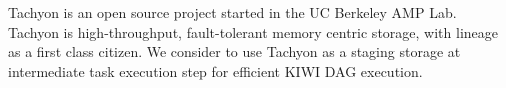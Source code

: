 \documentclass[twocolumn]{article}
\begin{document}
Tachyon is an open source project started in the UC Berkeley AMP Lab. 
Tachyon is high-throughput, fault-tolerant memory centric storage, with lineage as a first class citizen. 
We consider to use Tachyon as a staging storage at intermediate task execution step for efficient KIWI DAG execution.



\end{document}
